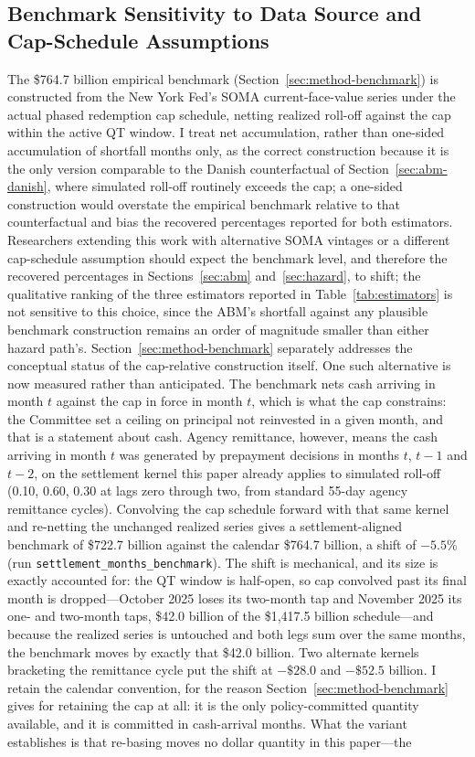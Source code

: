 \documentclass[12pt]{article}
\begin{document}
\subsection{Benchmark Sensitivity to Data Source and Cap-Schedule Assumptions}\label{sec:robustness-benchmark}

The \$764.7 billion empirical benchmark (Section~\ref{sec:method-benchmark}) is constructed from the New York Fed's SOMA current-face-value series under the actual phased redemption cap schedule, netting realized roll-off against the cap within the active QT window. I treat net accumulation, rather than one-sided accumulation of shortfall months only, as the correct construction because it is the only version comparable to the Danish counterfactual of Section~\ref{sec:abm-danish}, where simulated roll-off routinely exceeds the cap; a one-sided construction would overstate the empirical benchmark relative to that counterfactual and bias the recovered percentages reported for both estimators. Researchers extending this work with alternative SOMA vintages or a different cap-schedule assumption should expect the benchmark level, and therefore the recovered percentages in Sections~\ref{sec:abm} and~\ref{sec:hazard}, to shift; the qualitative ranking of the three estimators reported in Table~\ref{tab:estimators} is not sensitive to this choice, since the ABM's shortfall against any plausible benchmark construction remains an order of magnitude smaller than either hazard path's. Section~\ref{sec:method-benchmark} separately addresses the conceptual status of the cap-relative construction itself. One such alternative is now measured rather than anticipated. The benchmark nets cash arriving in month $t$ against the cap in force in month $t$, which is what the cap constrains: the Committee set a ceiling on principal not reinvested in a given month, and that is a statement about cash. Agency remittance, however, means the cash arriving in month $t$ was generated by prepayment decisions in months $t$, $t-1$ and $t-2$, on the settlement kernel this paper already applies to simulated roll-off (0.10, 0.60, 0.30 at lags zero through two, from standard 55-day agency remittance cycles). Convolving the cap schedule forward with that same kernel and re-netting the unchanged realized series gives a settlement-aligned benchmark of \$722.7 billion against the calendar \$764.7 billion, a shift of $-5.5$\% (run \texttt{settlement\_months\_benchmark}). The shift is mechanical, and its size is exactly accounted for: the QT window is half-open, so cap convolved past its final month is dropped---October 2025 loses its two-month tap and November 2025 its one- and two-month taps, \$42.0 billion of the \$1{,}417.5 billion schedule---and because the realized series is untouched and both legs sum over the same months, the benchmark moves by exactly that \$42.0 billion. Two alternate kernels bracketing the remittance cycle put the shift at $-\$28.0$ and $-\$52.5$ billion. I retain the calendar convention, for the reason Section~\ref{sec:method-benchmark} gives for retaining the cap at all: it is the only policy-committed quantity available, and it is committed in cash-arrival months. What the variant establishes is that re-basing moves no dollar quantity in this paper---the 
\end{document}
